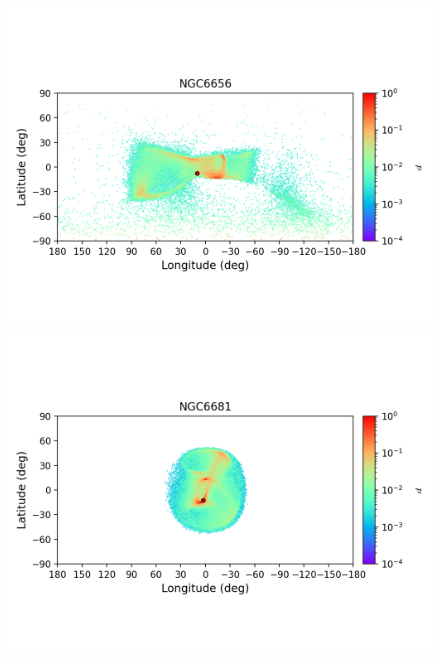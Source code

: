\begin{figure}
\begin{center}
                \includegraphics[clip=true, trim = 0mm 20mm 0mm 10mm, width=1\columnwidth]{images/error_plots_NGC6656.png}
                \includegraphics[clip=true, trim = 0mm 20mm 0mm 10mm, width=1\columnwidth]{images/error_plots_NGC6681.png}
                

\end{center}
\end{figure}
